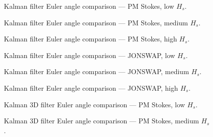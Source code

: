 \documentclass[11pt,letterpaper]{article}
\begin{document}

\begin{figure}[H]\centering
  \resizebox{\textwidth}{!}{}
  \caption{Kalman filter Euler angle comparison — PM Stokes, low $H_s$.}
  \label{fig:qmekf_pmstokes_low}
\end{figure}

\begin{figure}[H]\centering
  \resizebox{\textwidth}{!}{}
  \caption{Kalman filter Euler angle comparison — PM Stokes, medium $H_s$.}
  \label{fig:qmekf_pmstokes_medium}
\end{figure}

\begin{figure}[H]\centering
  \resizebox{\textwidth}{!}{}
  \caption{Kalman filter Euler angle comparison — PM Stokes, high $H_s$.}
  \label{fig:qmekf_pmstokes_high}
\end{figure}

\begin{figure}[H]\centering
  \resizebox{\textwidth}{!}{}
  \caption{Kalman filter Euler angle comparison — JONSWAP, low $H_s$.}
  \label{fig:qmekf_jonswap_low}
\end{figure}

\begin{figure}[H]\centering
  \resizebox{\textwidth}{!}{}
  \caption{Kalman filter Euler angle comparison — JONSWAP, medium $H_s$.}
  \label{fig:qmekf_jonswap_medium}
\end{figure}

\begin{figure}[H]\centering
  \resizebox{\textwidth}{!}{}
  \caption{Kalman filter Euler angle comparison — JONSWAP, high $H_s$.}
  \label{fig:qmekf_jonswap_high}
\end{figure}


\begin{figure}[H]\centering
  \resizebox{\textwidth}{!}{}
  \caption{Kalman 3D filter Euler angle comparison — PM Stokes, low $H_s$.}
  \label{fig:w3d_pmstokes_low}
\end{figure}

\begin{figure}[H]\centering
  \resizebox{\textwidth}{!}{}
  \caption{Kalman 3D filter Euler angle comparison — PM Stokes, medium $H_s$.}
  \label{fig:w3d_pmstokes_medium}
\end{figure}
\end{document}
